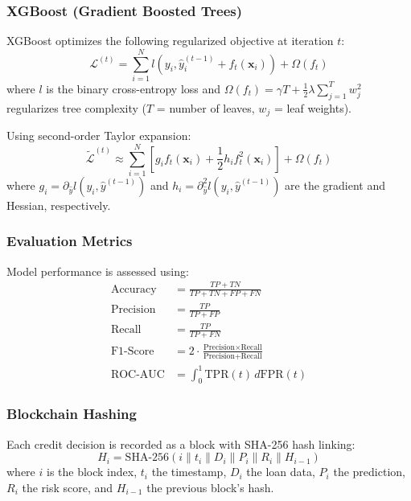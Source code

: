 \documentclass[runningheads]{llncs}
\begin{document}
\subsubsection{XGBoost (Gradient Boosted Trees)}
XGBoost optimizes the following regularized objective at iteration $t$:
\begin{equation}
    \mathcal{L}^{(t)} = \sum_{i=1}^{N} l(y_i, \hat{y}_i^{(t-1)} + f_t(\mathbf{x}_i)) + \Omega(f_t)
\end{equation}
where $l$ is the binary cross-entropy loss and $\Omega(f_t) = \gamma T + \frac{1}{2}\lambda \sum_{j=1}^{T} w_j^2$ regularizes tree complexity ($T$ = number of leaves, $w_j$ = leaf weights).

Using second-order Taylor expansion:
\begin{equation}
    \tilde{\mathcal{L}}^{(t)} \approx \sum_{i=1}^{N} \left[ g_i f_t(\mathbf{x}_i) + \frac{1}{2} h_i f_t^2(\mathbf{x}_i) \right] + \Omega(f_t)
\end{equation}
where $g_i = \partial_{\hat{y}} l(y_i, \hat{y}^{(t-1)})$ and $h_i = \partial^2_{\hat{y}} l(y_i, \hat{y}^{(t-1)})$ are the gradient and Hessian, respectively.

\subsubsection{Evaluation Metrics}
Model performance is assessed using:
\begin{align}
    \text{Accuracy} &= \frac{TP + TN}{TP + TN + FP + FN} \\
    \text{Precision} &= \frac{TP}{TP + FP} \\
    \text{Recall} &= \frac{TP}{TP + FN} \\
    \text{F1-Score} &= 2 \cdot \frac{\text{Precision} \times \text{Recall}}{\text{Precision} + \text{Recall}} \\
    \text{ROC-AUC} &= \int_0^1 \text{TPR}(t) \, d\text{FPR}(t)
\end{align}

\subsubsection{Blockchain Hashing}
Each credit decision is recorded as a block with SHA-256 hash linking:
\begin{equation}
    H_i = \text{SHA-256}(i \| t_i \| D_i \| P_i \| R_i \| H_{i-1})
\end{equation}
where $i$ is the block index, $t_i$ the timestamp, $D_i$ the loan data, $P_i$ the prediction, $R_i$ the risk score, and $H_{i-1}$ the previous block's hash.
\end{document}
